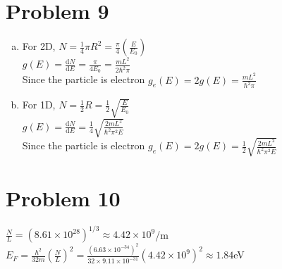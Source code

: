 \documentclass[a4paper]{article}
\begin{document}
\section{Problem 9}
\noindent
\begin{enumerate}[(a)]
    \item For 2D, $N=\frac{1}{4}\pi R^2=\frac{\pi}{4}(\frac{E}{E_0})$
    \\$g(E)=\frac{\mathrm{d}N}{\mathrm{d}E}=\frac{\pi}{4E_0}=\frac{mL^2}{2\hbar^2\pi}$
    \\Since the particle is electron $g_e(E)=2g(E)=\frac{mL^2}{\hbar^2\pi}$
    \item For 1D, $N=\frac{1}{2}R=\frac{1}{2}\sqrt{\frac{E}{E_0}}$
    \\$g(E)=\frac{\mathrm{d}N}{\mathrm{d}E}=\frac{1}{4}\sqrt{\frac{2mL^2}{\hbar^2\pi^2E}}$
    \\Since the particle is electron $g_e(E)=2g(E)=\frac{1}{2}\sqrt{\frac{2mL^2}{\hbar^2\pi^2E}}$
\end{enumerate}
\section{Problem 10}
\noindent $\frac{N}{L}=(8.61\times10^28)^{1/3}\approx 4.42\times10^9$/m
\\$E_F=\frac{h^2}{32m}(\frac{N}{L})^2=\frac{(6.63\times10^{-34})^2}{32\times9.11\times10^{-31}}(4.42\times10^9)^2\approx1.84$eV
\end{document}

